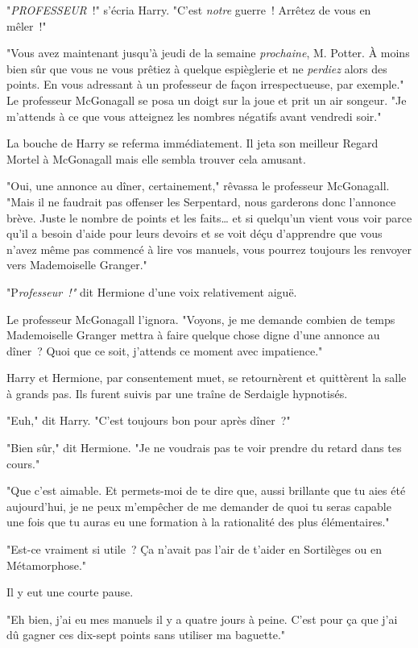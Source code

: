"\emph{PROFESSEUR}~!" s'écria Harry. "C'est \emph{notre} guerre~! Arrêtez de vous en mêler~!"

"Vous avez maintenant jusqu'à jeudi de la semaine \emph{prochaine}, M. Potter. À moins bien sûr que vous ne vous prêtiez à quelque espièglerie et ne \emph{perdiez} alors des points. En vous adressant à un professeur de façon irrespectueuse, par exemple." Le professeur McGonagall se posa un doigt sur la joue et prit un air songeur. "Je m'attends à ce que vous atteignez les nombres négatifs avant vendredi soir."

La bouche de Harry se referma immédiatement. Il jeta son meilleur Regard Mortel à McGonagall mais elle sembla trouver cela amusant.

"Oui, une annonce au dîner, certainement," rêvassa le professeur McGonagall. "Mais il ne faudrait pas offenser les Serpentard, nous garderons donc l'annonce brève. Juste le nombre de points et les faits… et si quelqu'un vient vous voir parce qu'il a besoin d'aide pour leurs devoirs et se voit déçu d'apprendre que vous n'avez même pas commencé à lire vos manuels, vous pourrez toujours les renvoyer vers Mademoiselle Granger."

"P\emph{rofesseur~!"} dit Hermione d'une voix relativement aiguë.

Le professeur McGonagall l'ignora. "Voyons, je me demande combien de temps Mademoiselle Granger mettra à faire quelque chose digne d'une annonce au dîner~? Quoi que ce soit, j'attends ce moment avec impatience."

Harry et Hermione, par consentement muet, se retournèrent et quittèrent la salle à grands pas. Ils furent suivis par une traîne de Serdaigle hypnotisés.

"Euh," dit Harry. "C'est toujours bon pour après dîner~?"

"Bien sûr," dit Hermione. "Je ne voudrais pas te voir prendre du retard dans tes cours."

"Que c'est aimable. Et permets-moi de te dire que, aussi brillante que tu aies été aujourd'hui, je ne peux m'empêcher de me demander de quoi tu seras capable une fois que tu auras eu une formation à la rationalité des plus élémentaires."

"Est-ce vraiment si utile~? Ça n'avait pas l'air de t'aider en Sortilèges ou en Métamorphose."

Il y eut une courte pause.

"Eh bien, j'ai eu mes manuels il y a quatre jours à peine. C'est pour ça que j'ai dû gagner ces dix-sept points sans utiliser ma baguette."

